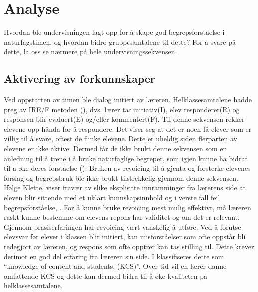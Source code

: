 \documentclass[main.tex]{subfiles}
\begin{document}
\section*{Analyse}
\label{sec:2}

Hvordan ble undervisningen lagt opp for å skape god begrepsforståelse i naturfagstimen, og hvordan 
bidro gruppesamtalene til dette? For å svare på dette, la oss se nærmere på hele 
undervisningssekvensen.

\subsection*{Aktivering av forkunnskaper}
Ved oppstarten av timen ble dialog initiert av læreren. Helklassesamtalene hadde preg av
IRE/F metoden (), dvs. lærer tar initiativ(I), elev responderer(R) og responsen blir 
evaluert(E) og/eller kommentert(F). Til denne sekvensen rekker elevene opp hånda for å respondere. 
Det viser seg at det er noen få elever som er villig til å svare, oftest de flinke elevene. Dette 
er uheldig siden flerparten av elevene er ikke aktive. Dermed får de ikke brukt denne sekvensen som
en anledning til å trene i å bruke naturfaglige begreper, som igjen kunne ha bidrat til å øke deres 
forståelse ().
\newline
\newline
Bruken av revoicing til å gjenta og forsterke elevenes forslag og begrepsbruk ble ikke brukt 
tilstrekkelig gjennom denne sekvensen. Ifølge Klette, viser fravær av slike eksplisitte 
innramminger fra lærerens side at eleven blir sittende med et uklart kunnskapsinnhold og i 
verste fall feil begrepsforståelse, . For å kunne bruke revoicing 
mest mulig effektivt, må læreren raskt kunne bestemme om elevens repons har validitet 
og om det er relevant. Gjennom prasiserfaringen har revoicing vært vanskelig å utføre. Ved å 
forutse elevsvar før elever i klassen blir initiert, kan misforståelser som ofte oppstår bli 
redegjort av læreren, og respons som ofte opptrer kan tas stilling til. Dette krever derimot 
en god del erfaring fra læreren sin side. I  klassifiseres dette som 
``knowledge of content and students, (KCS)''. Over tid vil en lærer danne omfattende KCS og
dette kan dermed bidra til å øke kvaliteten på helklassesamtalene. 
\end{document}
